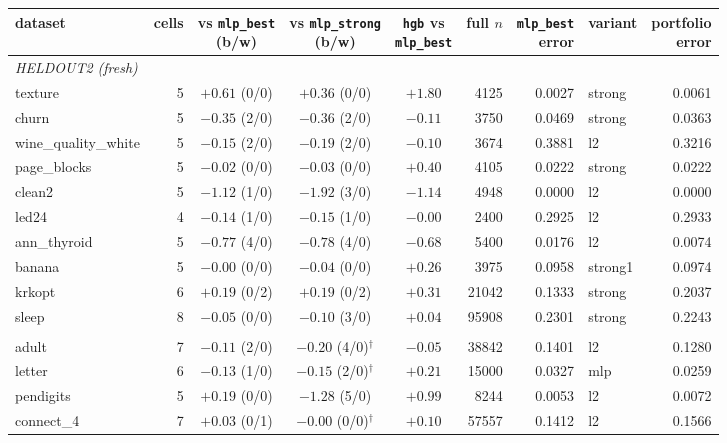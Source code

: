 \begin{tabular}{lrcccrrlr}
\toprule
dataset & cells & \hd{vs \texttt{mlp\_best}\\(b/w)} & \hd{vs \texttt{mlp\_strong}\\(b/w)} & \hd{\texttt{hgb} vs\\\texttt{mlp\_best}} & full $n$ & \hd{\texttt{mlp\_best}\\error} & variant & \hd{portfolio\\error}\\
\midrule
\multicolumn{9}{l}{\emph{HELDOUT2 (fresh)}}\\
texture & 5 & $+0.61$ (0/0) & $+0.36$ (0/0) & $+1.80$ & 4125 & 0.0027 & strong & 0.0061\\
churn & 5 & $-0.35$ (2/0) & $-0.36$ (2/0) & $-0.11$ & 3750 & 0.0469 & strong & 0.0363\\
wine\_quality\_white & 5 & $-0.15$ (2/0) & $-0.19$ (2/0) & $-0.10$ & 3674 & 0.3881 & l2 & 0.3216\\
page\_blocks & 5 & $-0.02$ (0/0) & $-0.03$ (0/0) & $+0.40$ & 4105 & 0.0222 & strong & 0.0222\\
clean2 & 5 & $-1.12$ (1/0) & $-1.92$ (3/0) & $-1.14$ & 4948 & 0.0000 & l2 & 0.0000\\
led24 & 4 & $-0.14$ (1/0) & $-0.15$ (1/0) & $-0.00$ & 2400 & 0.2925 & l2 & 0.2933\\
ann\_thyroid & 5 & $-0.77$ (4/0) & $-0.78$ (4/0) & $-0.68$ & 5400 & 0.0176 & l2 & 0.0074\\
banana & 5 & $-0.00$ (0/0) & $-0.04$ (0/0) & $+0.26$ & 3975 & 0.0958 & strong1 & 0.0974\\
krkopt & 6 & $+0.19$ (0/2) & $+0.19$ (0/2) & $+0.31$ & 21042 & 0.1333 & strong & 0.2037\\
sleep & 8 & $-0.05$ (0/0) & $-0.10$ (3/0) & $+0.04$ & 95908 & 0.2301 & strong & 0.2243\\
\addlinespace[2pt]
\multicolumn{9}{l}{\emph{Part 7 tabular set (references known to the designers)}}\\
adult & 7 & $-0.11$ (2/0) & $-0.20$ (4/0)$^\dagger$ & $-0.05$ & 38842 & 0.1401 & l2 & 0.1280\\
letter & 6 & $-0.13$ (1/0) & $-0.15$ (2/0)$^\dagger$ & $+0.21$ & 15000 & 0.0327 & mlp & 0.0259\\
pendigits & 5 & $+0.19$ (0/0) & $-1.28$ (5/0) & $+0.99$ & 8244 & 0.0053 & l2 & 0.0072\\
connect\_4 & 7 & $+0.03$ (0/1) & $-0.00$ (0/0)$^\dagger$ & $+0.10$ & 57557 & 0.1412 & l2 & 0.1566\\

\end{tabular}
